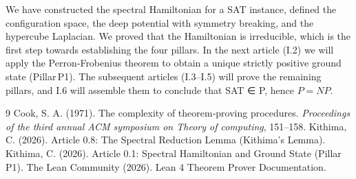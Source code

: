 \documentclass[11pt,a4paper]{article}
\begin{document}
We have constructed the spectral Hamiltonian for a SAT instance, defined the configuration space, the deep potential with symmetry breaking, and the hypercube Laplacian. We proved that the Hamiltonian is irreducible, which is the first step towards establishing the four pillars. In the next article (I.2) we will apply the Perron‑Frobenius theorem to obtain a unique strictly positive ground state (Pillar P1). The subsequent articles (I.3–I.5) will prove the remaining pillars, and I.6 will assemble them to conclude that SAT ∈ P, hence $P = NP$.


\begin{thebibliography}{9}
  Cook, S. A. (1971). The complexity of theorem‑proving procedures. \emph{Proceedings of the third annual ACM symposium on Theory of computing}, 151–158.
  Kithima, C. (2026). Article 0.8: The Spectral Reduction Lemma (Kithima's Lemma).
  Kithima, C. (2026). Article 0.1: Spectral Hamiltonian and Ground State (Pillar P1).
  The Lean Community (2026). Lean 4 Theorem Prover Documentation.
\end{thebibliography}
\end{document}
